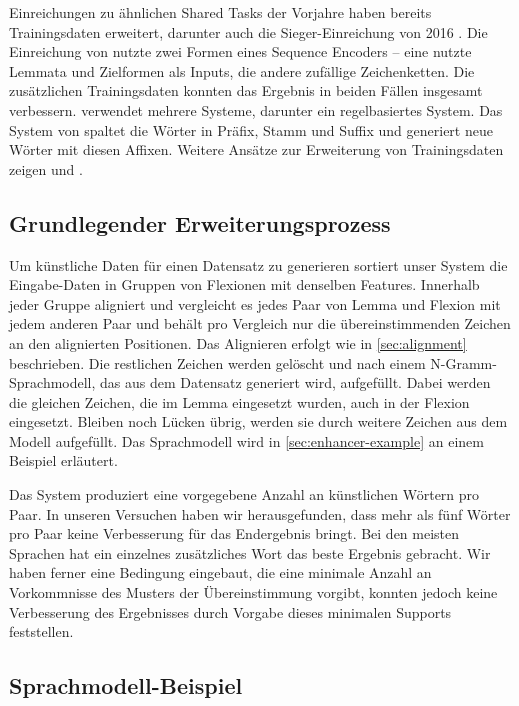 \documentclass[11pt,a4paper]{article}
\begin{document}
Einreichungen zu ähnlichen Shared Tasks der Vorjahre haben bereits Trainingsdaten erweitert, darunter auch die Sieger-Einreichung von 2016 \cite{kann-schutze:2016:SIGMORPHON}. Die Einreichung von \citet{bergmanis:augmenting} nutzte zwei Formen eines Sequence Encoders -- eine nutzte Lemmata und Zielformen als Inputs, die andere zufällige Zeichenketten. Die zusätzlichen Trainingsdaten konnten das Ergebnis in beiden Fällen insgesamt verbessern. \citet{kann-schutze:2017:K17-20} verwendet mehrere Systeme, darunter ein regelbasiertes System. Das System von \citet{silfverberg-EtAl:2017:K17-20} spaltet die Wörter in Präfix, Stamm und Suffix und generiert neue Wörter mit diesen Affixen. Weitere Ansätze zur Erweiterung von Trainingsdaten zeigen \citet{zhou-neubig:2017:K17-20} und \citet{nicolai-EtAl:2017:K17-20}.

\subsection{Grundlegender Erweiterungsprozess}
Um künstliche Daten für einen Datensatz zu generieren sortiert unser System die Eingabe-Daten in Gruppen von Flexionen mit denselben Features. Innerhalb jeder Gruppe aligniert und vergleicht es jedes Paar von Lemma und Flexion mit jedem anderen Paar und behält pro Vergleich nur die übereinstimmenden Zeichen an den alignierten Positionen. Das Alignieren erfolgt wie in \autoref{sec:alignment} beschrieben. Die restlichen Zeichen werden gelöscht und nach einem N-Gramm-Sprachmodell, das aus dem Datensatz generiert wird, aufgefüllt. Dabei werden die gleichen Zeichen, die im Lemma eingesetzt wurden, auch in der Flexion eingesetzt. Bleiben noch Lücken übrig, werden sie durch weitere Zeichen aus dem Modell aufgefüllt. Das Sprachmodell wird in \autoref{sec:enhancer-example} an einem Beispiel erläutert.

Das System produziert eine vorgegebene Anzahl an künstlichen Wörtern pro Paar. In unseren Versuchen haben wir herausgefunden, dass mehr als fünf Wörter pro Paar keine Verbesserung für das Endergebnis bringt. Bei den meisten Sprachen hat ein einzelnes zusätzliches Wort das beste Ergebnis gebracht. Wir haben ferner eine Bedingung eingebaut, die eine minimale Anzahl an Vorkommnisse des Musters der Übereinstimmung vorgibt, konnten jedoch keine Verbesserung des Ergebnisses durch Vorgabe dieses minimalen Supports feststellen.

\subsection{Sprachmodell-Beispiel}
\label{sec:enhancer-example}
\end{document}
